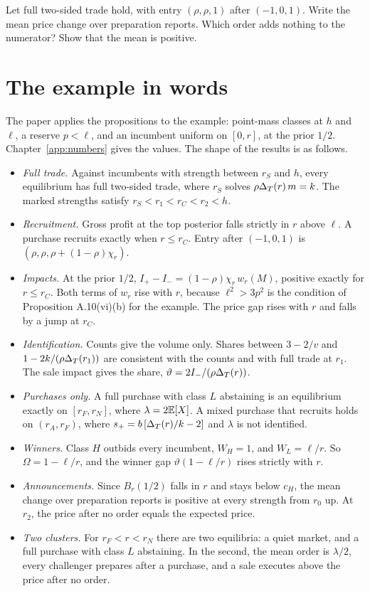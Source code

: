 \begin{checkyourself}\label{q:empirical-announce}
Let full two-sided trade hold, with entry \((\rho,\rho,1)\) after \((-1,0,1)\). Write the mean price change over preparation reports. Which order adds nothing to the numerator? Show that the mean is positive.
\end{checkyourself}

\section{The example in words}\label{sec:empirical-example}

The paper applies the propositions to the example: point-mass classes at \(h\) and \(\ell\), a reserve \(p<\ell\), and an incumbent uniform on \([0,r]\), at the prior \(1/2\). Chapter~\ref{app:numbers} gives the values. The shape of the results is as follows.
\begin{itemize}
\item \emph{Full trade.} Against incumbents with strength between \(r_S\) and \(h\), every equilibrium has full two-sided trade, where \(r_S\) solves \(\rho\Delta_T(r)\,m=k\). The marked strengths satisfy \(r_S<r_1<r_C<r_2<h\).
\item \emph{Recruitment.} Gross profit at the top posterior falls strictly in \(r\) above \(\ell\). A purchase recruits exactly when \(r\le r_C\). Entry after \((-1,0,1)\) is \((\rho,\rho,\rho+(1-\rho)\chi_r)\).
\item \emph{Impacts.} At the prior \(1/2\), \(I_+-I_-=(1-\rho)\chi_r\,w_r(M)\), positive exactly for \(r\le r_C\). Both terms of \(w_r\) rise with \(r\), because \(\ell^2>3p^2\) is the condition of Proposition A.10(vi)(b) for the example. The price gap rises with \(r\) and falls by a jump at \(r_C\).
\item \emph{Identification.} Counts give the volume only. Shares between \(3-2/v\) and \(1-2k/(\rho\Delta_T(r_1))\) are consistent with the counts and with full trade at \(r_1\). The sale impact gives the share, \(\vartheta=2I_-/(\rho\Delta_T(r))\).
\item \emph{Purchases only.} A full purchase with class \(L\) abstaining is an equilibrium exactly on \([r_F,r_N]\), where \(\lambda=2\mathbb{E}[X]\). A mixed purchase that recruits holds on \((r_A,r_F)\), where \(s_+=b\,[\Delta_T(r)/k-2]\) and \(\lambda\) is not identified.
\item \emph{Winners.} Class \(H\) outbids every incumbent, \(W_H=1\), and \(W_L=\ell/r\). So \(\Omega=1-\ell/r\), and the winner gap \(\vartheta(1-\ell/r)\) rises strictly with \(r\).
\item \emph{Announcements.} Since \(B_r(1/2)\) falls in \(r\) and stays below \(c_H\), the mean change over preparation reports is positive at every strength from \(r_0\) up. At \(r_2\), the price after no order equals the expected price.
\item \emph{Two clusters.} For \(r_F<r<r_N\) there are two equilibria: a quiet market, and a full purchase with class \(L\) abstaining. In the second, the mean order is \(\lambda/2\), every challenger prepares after a purchase, and a sale executes above the price after no order.
\end{itemize}

